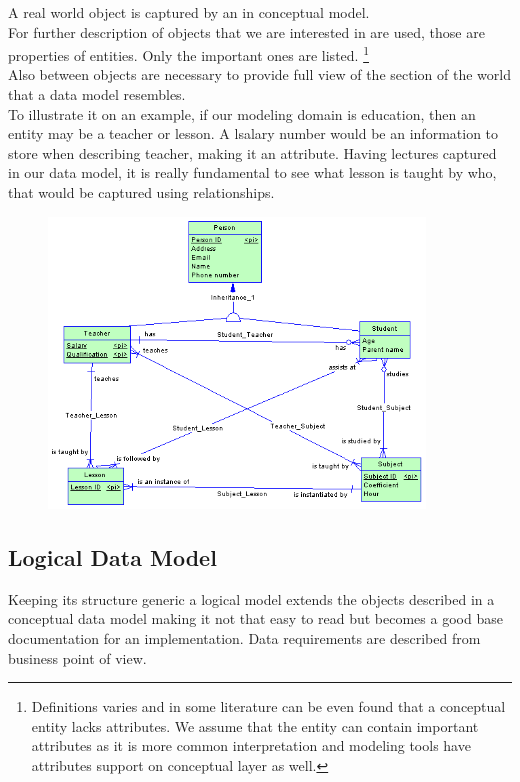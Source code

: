 A real world object is captured by an  in conceptual model. \\
For further description of objects that we are interested in  are used, those are properties of entities. Only the important ones are listed. \footnote{Definitions varies and in some literature can be even found that a conceptual entity lacks attributes. We assume that the entity can contain important attributes as it is more common interpretation and modeling tools have attributes support on conceptual layer as well.} \\
Also  between objects are necessary to provide full view of the section of the world that a data model resembles. \\

To illustrate it on an example, if our modeling domain is education, then an entity may be a teacher or lesson. 
A lsalary number would be an information to store when describing teacher, making it an attribute.
Having lectures captured in our data model, it is really fundamental to see what lesson is taught by who, that would be captured using relationships.

\begin{figure}[H]
	\centering
	\includegraphics[width=10cm]{../img/Conceptual_Model_PowerDesigner}
	\caption{\cite{ConceptualModelExample}}
\end{figure}

\subsection{Logical Data Model}

Keeping its structure generic a logical model extends the objects described in a conceptual data model making it not that easy to read but becomes a good base documentation for an implementation. Data requirements are described from business point of view.


